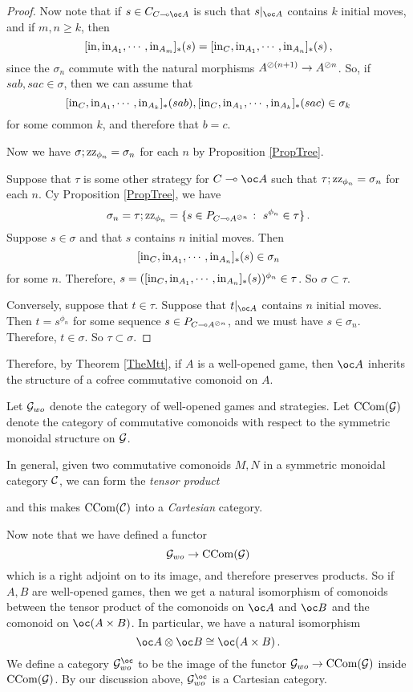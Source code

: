 \documentclass[11pt]{report}
\begin{document}
\begin{proof}
  Now note that if $s\in C_{C\implies \oc A}$ is such that $s\vert_{\oc A}$ contains $k$ initial moves, and if $m,n\ge k$, then
  \[
    [\operatorname{in},\operatorname{in}_{A_1},\cdots,\operatorname{in}_{A_m}]_*(s) = [\operatorname{in}_C,\operatorname{in}_{A_1},\cdots,\operatorname{in}_{A_n}]_*(s)\,,
    \]
  since the $\sigma_n$ commute with the natural morphisms $A^{\oslash (n+1)} \to A^{\oslash n}$.  
  So, if $sab,sac\in\sigma$, then we can assume that
  \[
    [\operatorname{in}_C,\operatorname{in}_{A_1},\cdots,\operatorname{in}_{A_k}]_*(sab),[\operatorname{in}_C,\operatorname{in}_{A_1},\cdots,\operatorname{in}_{A_k}]_*(sac)\in\sigma_k
  \]
  for some common $k$, and therefore that $b=c$.

  Now we have $\sigma;\operatorname{zz}_{\phi_n}=\sigma_n$ for each $n$ by Proposition \ref{PropTree}.

  Suppose that $\tau$ is some other strategy for $C\implies \oc A$ such that $\tau;\operatorname{zz}_{\phi_n}=\sigma_n$ for each $n$.  
  Cy Proposition \ref{PropTree}, we have
  \[
    \sigma_n = \tau;\operatorname{zz}_{\phi_n} = \{s\in P_{C\multimap A^{\oslash n}}\;\colon\; s^{\phi_n}\in\tau\}\,.
    \]
  Suppose $s\in\sigma$ and that $s$ contains $n$ initial moves.  
  Then 
  \[
    [\operatorname{in}_C,\operatorname{in}_{A_1},\cdots,\operatorname{in}_{A_n}]_*(s)\in\sigma_n
    \]
  for some $n$.  
  Therefore, $s=([\operatorname{in}_C,\operatorname{in}_{A_1},\cdots,\operatorname{in}_{A_n}]_*(s))^{\phi_n}\in\tau$.  
  So $\sigma\subset\tau$.
  
  Conversely, suppose that $t\in\tau$.  
  Suppose that $t\vert_{\oc A}$ contains $n$ initial moves.  
  Then $t=s^{\phi_n}$ for some sequence $s\in P_{C\multimap A^{\oslash n}}$, and we must have $s\in\sigma_n$.  
  Therefore, $t\in\sigma$.  
  So $\tau\subset\sigma$.
\end{proof}

Therefore, by Theorem \ref{TheMtt}, if $A$ is a well-opened game, then $\oc A$ inherits the structure of a cofree commutative comonoid on $A$.

Let $\mathcal G_{wo}$ denote the category of well-opened games and strategies.  
Let $\operatorname{CCom}(\mathcal G)$ denote the category of commutative comonoids with respect to the symmetric monoidal structure on $\mathcal G$.

In general, given two commutative comonoids $M,N$ in a symmetric monoidal category ${\mathcal{C}}$, we can form the \emph{tensor product}
and this makes $\operatorname{CCom}({\mathcal{C}})$ into a \emph{Cartesian} category.  

Now note that we have defined a functor
\[
  \mathcal G_{wo} \to \operatorname{CCom}(\mathcal G)
  \]
which is a right adjoint on to its image, and therefore preserves products.  
So if $A,B$ are well-opened games, then we get a natural isomorphism of comonoids between the tensor product of the comonoids on $\oc A$ and $\oc B$ and the comonoid on $\oc(A\times B)$.
In particular, we have a natural isomorphism
\[
  \oc A \tensor \oc B \cong \oc (A \times B)\,.
  \]
We define a category $\G_{wo}^{\oc}$ to be the image of the functor $\mathcal G_{wo}\to \operatorname{CCom}(\mathcal G)$ inside $\operatorname{CCom}(\mathcal G)$.  
By our discussion above, $\G_{wo}^{\oc}$ is a Cartesian category.  
\end{document}
